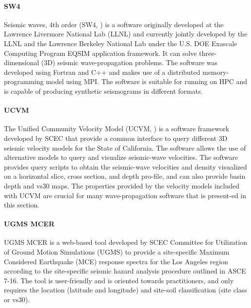 \paragraph{SW4} Seismic waves, 4th order (SW4, \cite{petersson2017geodynamics}) is a software originally developed at the Lawrence Livermore National Lab (LLNL) and currently jointly developed by the LLNL and the Lawrence Berkeley National Lab under the U.S. DOE Exascale Computing Program EQSIM application framework. It can solve three-dimensional (3D) seismic wave-propagation problems. The software was developed using Fortran and C++ and makes use of a distributed memory-programming model using MPI. The software is suitable for running on HPC and is capable of producing synthetic seismograms in different formats.

\paragraph{UCVM} The Unified Community Velocity Model (UCVM, \cite{small2017scec}) is a software framework developed by SCEC that provide a common interface to query different 3D seismic velocity models for the State of California. The software allows the use of alternative models to query and visualize seismic-wave velocities. The software provides query scripts to obtain the seismic-wave velocities and density visualized on a horizontal slice, cross section, and depth pro-file, and can also provide basin depth and vs30 maps. The properties provided by the velocity models included with UCVM are crucial for many wave-propagation software that is present-ed in this section.

\paragraph{UGMS MCER} UGMS MCER \citep{crouse2018sitespecific} is a web-based tool developed by SCEC Committee for Utilization of Ground Motion Simulations (UGMS) to provide a site-specific Maximum Considered Earthquake (MCE) response spectra for the Los Angeles region according to the site-specific seismic hazard analysis procedure outlined in ASCE 7-16. The tool is user-friendly and is oriented towards practitioners, and only requires the location (latitude and longitude) and site-soil classification (site class or vs30).

